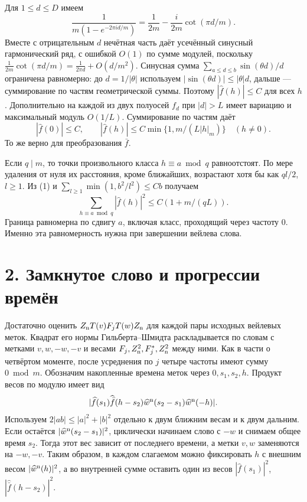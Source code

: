 \documentclass[11pt,a4paper]{article}
\newcommand{\sect}[1]{\section*{\sffamily\color{ink}#1}}
\begin{document}
Для \(1\le d\le D\) имеем
\[
  \frac1{m(1-e^{-2\pi i d/m})}=\frac1{2m}-\frac{i}{2m}\cot(\pi d/m).
\]
Вместе с отрицательным \(d\) нечётная часть даёт усечённый синусный гармонический ряд, с ошибкой \(O(1)\) по сумме модулей, поскольку \(\frac1{2m}\cot(\pi d/m)=\frac1{2\pi d}+O(d/m^2)\). Синусная сумма \(\sum_{a\le d\le b}\sin(\theta d)/d\) ограничена равномерно: до \(d=1/|\theta|\) используем \(|\sin(\theta d)|\le|\theta|d\), дальше --- суммирование по частям геометрической суммы. Поэтому \(|\widehat f(h)|\le C\) для всех \(h\). Дополнительно на каждой из двух полуосей \(f_d\) при \(|d|>L\) имеет вариацию и максимальный модуль \(O(1/L)\). Суммирование по частям даёт
\begin{equation}
       |\widehat f(0)|\le C,\qquad
       |\widehat f(h)|\le C\min\{1,m/(L|h|_m)\}\quad(h\ne0).
                                                               \tag{1}
\end{equation}
То же верно для преобразования \(\bar f\).

Если \(q\mid m\), то точки произвольного класса \(h\equiv a\bmod q\) равноотстоят. По мере удаления от нуля их расстояния, кроме ближайших, возрастают хотя бы как \(q l/2\), \(l\ge1\). Из (1) и \(\sum_{l\ge1}\min(1,b^2/l^2)\le Cb\) получаем
\begin{equation}
                \sum_{h\equiv a\bmod q}|\widehat f(h)|^2
                          \le C(1+m/(qL)).
                                                               \tag{2}
\end{equation}
Граница равномерна по сдвигу \(a\), включая класс, проходящий через частоту \(0\). Именно эта равномерность нужна при завершении вейлева слова.
\newpage
\sect{2. Замкнутое слово и прогрессии времён}
Достаточно оценить \(Z_{\rm n}T(v)F_jT(w)Z_{\rm n}\) для каждой пары исходных вейлевых меток. Квадрат его нормы Гильберта--Шмидта раскладывается по словам с метками \(v,w,-w,-v\) и весами \(F_j,Z_{\rm n}^2,F_j^*,Z_{\rm n}^2\) между ними. Как в части о четвёртом моменте, после усреднения по \(j\) четыре частоты имеют сумму \(0\bmod m\). Обозначим накопленные времена меток через \(0,s_1,s_2,h\). Продукт весов по модулю имеет вид
\[
 |\widehat f(s_1)\widehat{\bar f}(h-s_2)
                   \widehat w^{\rm n}(s_2-s_1)\widehat w^{\rm n}(-h)|.
\]
Используем \(2|ab|\le |a|^2+|b|^2\) отдельно к двум ближним весам и к двум дальним. Если остаётся \(|\widehat w^{\rm n}(s_2-s_1)|^2\), циклически начинаем слово с \(-w\) и снимаем общее время \(s_2\). Тогда этот вес зависит от последнего времени, а метки \(v,w\) заменяются на \(-w,-v\). Таким образом, в каждом слагаемом можно фиксировать \(h\) с внешним весом \(|\widehat w^{\rm n}(h)|^2\), а во внутренней сумме оставить один из весов \(|\widehat f(s_1)|^2\), \(|\widehat{\bar f}(h-s_2)|^2\).
\end{document}
